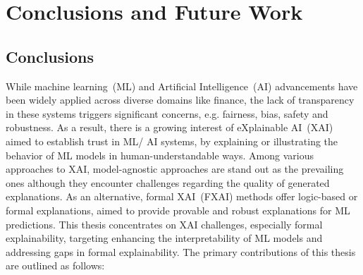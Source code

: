 \chapter{Conclusions and Future Work}\label{chap:conc}

\section*{Conclusions}

%

While machine learning~(ML) and Artificial Intelligence~(AI) advancements have been 
widely applied across diverse domains like finance, 
the lack of transparency in these systems triggers significant concerns, 
e.g. fairness, bias, safety and robustness.
%
As a result, there is a growing interest of eXplainable AI~(XAI) aimed to establish trust in ML/ AI 
systems, by explaining or illustrating the behavior of ML models in 
human-understandable ways.
%
Among various approaches to XAI, model-agnostic approaches are
stand out as the prevailing ones although they encounter challenges regarding 
the quality of generated explanations. 
%
As an alternative, formal XAI~(FXAI) methods offer logic-based or formal explanations, 
aimed to provide provable and robust explanations for ML predictions.
%
This thesis concentrates on XAI challenges, especially formal explainability,
targeting enhancing the interpretability of ML models
and addressing gaps in formal explainability.
%
The primary contributions of this thesis are outlined as follows:

